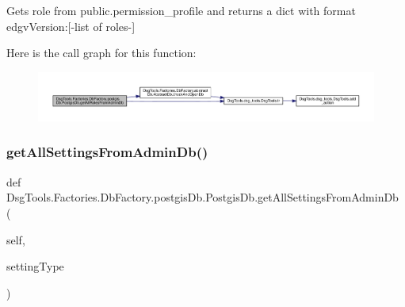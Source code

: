 \begin{DoxyVerb}Gets role from public.permission_profile and returns a dict with format {edgvVersion:[-list of roles-]}
\end{DoxyVerb}
 Here is the call graph for this function\+:
\nopagebreak
\begin{figure}[H]
\begin{center}
\leavevmode
\includegraphics[width=350pt]{class_dsg_tools_1_1_factories_1_1_db_factory_1_1postgis_db_1_1_postgis_db_a780e78e0c9234120ff4662bf5892c5a4_cgraph}
\end{center}
\end{figure}
\mbox{\label{class_dsg_tools_1_1_factories_1_1_db_factory_1_1postgis_db_1_1_postgis_db_a87f17b0f87c84679d77ca6a197c78eaf}} 
\subsubsection{\texorpdfstring{get\+All\+Settings\+From\+Admin\+Db()}{getAllSettingsFromAdminDb()}}
{\footnotesize\ttfamily def Dsg\+Tools.\+Factories.\+Db\+Factory.\+postgis\+Db.\+Postgis\+Db.\+get\+All\+Settings\+From\+Admin\+Db (\begin{DoxyParamCaption}\item[{}]{self,  }\item[{}]{setting\+Type }\end{DoxyParamCaption})}

